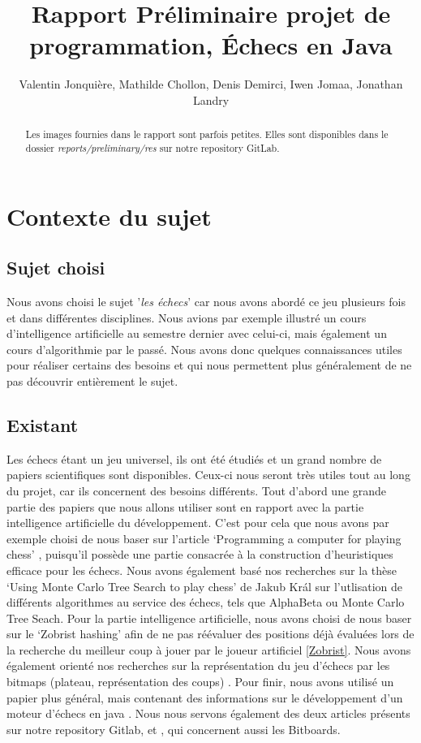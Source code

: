 \documentclass{article}
\author{
    Valentin Jonquière,
    Mathilde Chollon,
    Denis Demirci,
    Iwen Jomaa,
    Jonathan Landry
}
\title{Rapport Préliminaire projet de programmation, Échecs en Java}
\begin{document}
\maketitle

\pagebreak

\tableofcontents

\pagebreak
\begin{abstract}
    Les images fournies dans le rapport sont parfois petites.
    Elles sont disponibles dans le dossier \textit{reports/preliminary/res}
    sur notre repository GitLab.
 \end{abstract}
\section{Contexte du sujet}
\subsection{Sujet choisi}
Nous avons choisi le sujet '\textit{les échecs}' car nous avons abordé ce jeu
plusieurs fois et dans différentes disciplines. Nous avions par exemple illustré un 
cours d'intelligence artificielle au semestre dernier avec celui-ci, mais 
également un cours d'algorithmie par le passé. Nous avons donc quelques connaissances 
utiles pour réaliser certains des besoins et qui nous permettent plus généralement de ne pas
découvrir entièrement le sujet.

\subsection{Existant}
Les échecs étant un jeu universel, ils ont été étudiés et un grand nombre de papiers scientifiques
sont disponibles. Ceux-ci nous seront très utiles tout au long du projet, car ils concernent des
besoins différents. Tout d'abord une grande partie des papiers que nous allons utiliser sont en rapport
avec la partie intelligence artificielle du développement. C'est pour cela que nous avons par exemple
choisi de nous baser sur l'article `Programming a computer for playing chess' \cite{Shannon1950}, 
puisqu'il possède une partie consacrée à la construction d'heuristiques efficace pour les échecs.
Nous avons également basé nos recherches sur la thèse `Using Monte Carlo Tree Search to play chess' \cite{Kral2021}
de Jakub Král sur l'utlisation de différents algorithmes au service des échecs, tels que AlphaBeta ou
Monte Carlo Tree Seach. Pour la partie intelligence artificielle, nous avons choisi de nous baser sur le 
`Zobrist hashing' \cite{ZobristHashing} afin de ne pas réévaluer des positions déjà évaluées lors de la 
recherche du meilleur coup à jouer par le joueur artificiel \ref{Zobrist}. Nous avons également orienté
nos recherches sur la représentation du jeu d'échecs par les bitmaps (plateau, représentation des coups) \cite{Bijl2021}.
Pour finir, nous avons utilisé un papier plus général, mais contenant des informations sur le développement
d'un moteur d'échecs en java \cite{PaulDailly}. Nous nous servons également des deux articles présents sur 
notre repository Gitlab, \cite{Bitboards} et \cite{GameBitboards}, qui concernent aussi les Bitboards.
\end{document}
